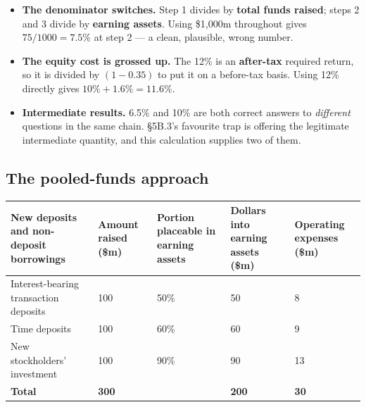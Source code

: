 \begin{lrtrapbox}
\begin{itemize}
\item \textbf{The denominator switches.} Step 1 divides by \textbf{total funds raised}; steps 2 and 3 divide by \textbf{earning assets}. Using \$1,000m throughout gives $75/1000 = 7.5\%$ at step 2 --- a clean, plausible, wrong number.
\item \textbf{The equity cost is grossed up.} The 12\% is an \textbf{after-tax} required return, so it is divided by $(1 - 0.35)$ to put it on a before-tax basis. Using 12\% directly gives $10\% + 1.6\% = 11.6\%$.
\item \textbf{Intermediate results.} 6.5\% and 10\% are both correct answers to \emph{different} questions in the same chain. \S5B.3's favourite trap is offering the legitimate intermediate quantity, and this calculation supplies two of them.
\end{itemize}
\end{lrtrapbox}

\subsection{The pooled-funds approach}

\begin{center}
\small
\begin{tabular}{@{}p{4.3cm} p{2.1cm} p{2.5cm} p{2.6cm} p{2.5cm}@{}}
\toprule
\rowcolor{FRMSoft}\textbf{New deposits and non-deposit borrowings} & \raggedright\textbf{Amount raised (\$m)} & \raggedright\textbf{Portion placeable in earning assets} & \raggedright\textbf{Dollars into earning assets (\$m)} & \textbf{Operating expenses (\$m)} \\
\midrule
Interest-bearing transaction deposits & 100 & 50\% & 50 & 8 \\
Time deposits & 100 & 60\% & 60 & 9 \\
New stockholders' investment & 100 & 90\% & 90 & 13 \\
\midrule
\textbf{Total} & \textbf{300} & & \textbf{200} & \textbf{30} \\
\bottomrule
\end{tabular}
\end{center}

